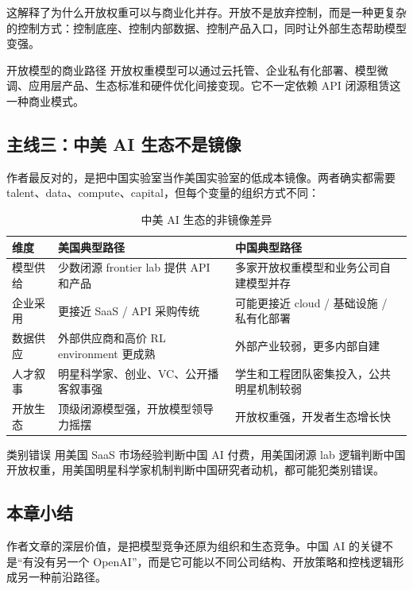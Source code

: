 这解释了为什么开放权重可以与商业化并存。开放不是放弃控制，而是一种更复杂的控制方式：控制底座、控制内部数据、控制产品入口，同时让外部生态帮助模型变强。

\begin{knowledgebox}{开放模型的商业路径}
开放权重模型可以通过云托管、企业私有化部署、模型微调、应用层产品、生态标准和硬件优化间接变现。它不一定依赖 API 闭源租赁这一种商业模式。
\end{knowledgebox}

\subsection{主线三：中美 AI 生态不是镜像}

作者最反对的，是把中国实验室当作美国实验室的低成本镜像。两者确实都需要 talent、data、compute、capital，但每个变量的组织方式不同：

\begin{table}[H]
\centering
\caption{中美 AI 生态的非镜像差异}
\begin{tabular}{@{}p{3.1cm}p{5.4cm}p{5.4cm}@{}}
\toprule
\textbf{维度} & \textbf{美国典型路径} & \textbf{中国典型路径} \\
\midrule
模型供给 & 少数闭源 frontier lab 提供 API 和产品 & 多家开放权重模型和业务公司自建模型并存 \\
企业采用 & 更接近 SaaS / API 采购传统 & 可能更接近 cloud / 基础设施 / 私有化部署 \\
数据供应 & 外部供应商和高价 RL environment 更成熟 & 外部产业较弱，更多内部自建 \\
人才叙事 & 明星科学家、创业、VC、公开播客叙事强 & 学生和工程团队密集投入，公共明星机制较弱 \\
开放生态 & 顶级闭源模型强，开放模型领导力摇摆 & 开放权重强，开发者生态增长快 \\
\bottomrule
\end{tabular}
\end{table}

\begin{warningbox}{类别错误}
用美国 SaaS 市场经验判断中国 AI 付费，用美国闭源 lab 逻辑判断中国开放权重，用美国明星科学家机制判断中国研究者动机，都可能犯类别错误。
\end{warningbox}

\subsection{本章小结}

作者文章的深层价值，是把模型竞争还原为组织和生态竞争。中国 AI 的关键不是``有没有另一个 OpenAI''，而是它可能以不同公司结构、开放策略和控栈逻辑形成另一种前沿路径。


